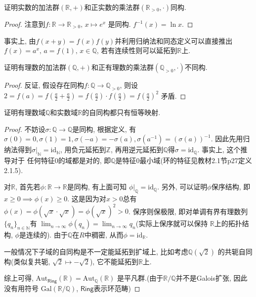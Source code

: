 \begin{problem}
    证明实数的加法群$(\mathbb{R}, +)$和正实数的乘法群$(\mathbb{R}_{>0}, \cdot)$同构.
\end{problem}

\begin{proof}
    注意到$f: \mathbb{R} \to \mathbb{R}_{>0},\, x \mapsto e^x$
是同构. $f^{-1}(x) = \ln x$.
\end{proof}

\begin{remark}
    事实上, 由$f(x + y) = f(x)f(y)$并利用归纳法和同态定义可以直接推出
$f(x) = a^x,\, a = f(1),\, x \in \mathbb{Q}$, 若有连续性则可以延拓到$\mathbb{R}$上.
\end{remark}

\begin{problem}
    证明有理数的加法群$(\mathbb{Q}, +)$和正有理数的乘法群$(\mathbb{Q}_{>0}, \cdot)$不同构.
\end{problem}

\begin{proof}
    反证, 假设存在同构$f: \mathbb{Q} \to \mathbb{Q}_{>0}$,
则设$2 = f(a) = f(\frac{a}{2} + \frac{a}{2}) = f(\frac{a}{2}) \cdot f(\frac{a}{2}) = f(\frac{a}{2})^2$
矛盾.
\end{proof}

\begin{problem}\label{ex:1.4.7}
    证明有理数域$\mathbb{Q}$和实数域$\mathbb{R}$的自同构都只有恒等映射.
\end{problem}

\begin{proof}
    不妨设$\sigma: \mathbb{Q} \to \mathbb{Q}$是同构, 根据定义,
有$\sigma(0) = 0, \sigma(1) = 1, \sigma(-a) = -\sigma(a), \sigma(a^{-1}) = (\sigma(a))^{-1}$.
因此先用归纳法得到$\sigma|_{\mathbb{N}} = \mathrm{id}_{\mathbb{N}}$, 用负元延拓到$\mathbb{Z}$,
再用逆元延拓到$\mathbb{Q}$得$\sigma = \mathrm{id}_{\mathbb{Q}}$. 事实上, 这个推导对于
任何特征$0$的域都是对的, 即$\mathbb{Q}$是特征$0$最小域(环的特征见教材2.1节p27定义2.1.5).

    对$\mathbb{R}$, 首先若$\phi: \mathbb{R} \to \mathbb{R}$是同构, 有上面可知
$\phi|_{\mathbb{Q}} = \mathrm{id}_{\mathbb{Q}}$. 另外, 可以证明$\phi$保序结构,
即$x \geqslant 0 \implies \phi(x) \geqslant 0$. 这是因为对$x > 0$总有
$\phi(x) = \phi(\sqrt{x} \cdot \sqrt{x}) = \phi(\sqrt{x})^2 > 0$. 保序则保极限,
即对单调有界有理数列$\{q_n\}_{n \in \mathbb{N}}$有
$\lim_{n \to \infty} \phi(q_n) = \lim_{n \to \infty} q_n$(实际上保序就可以保持
$\mathbb{R}$上的拓扑结构, $\phi$是连续的). 由于$\mathbb{Q}$在$R$中稠密,
从而$\phi = \mathrm{id}_{\mathbb{R}}$.

    一般情况下子域的自同构是不一定能延拓到扩域上, 比如考虑$\mathbb{Q}(\sqrt{2})$
的共轭自同构(类似复共轭, $\sqrt{2} \mapsto -\sqrt{2}$), 它不能延拓到$\mathbb{R}$上.

    综上可得,
$\mathrm{Aut}_{\mathsf{Ring}}(\mathbb{R}) = \mathrm{Aut}_{\mathbb{Q}}(\mathbb{R})$
是平凡群.(由于$\mathbb{R}/\mathbb{Q}$并不是Galois扩张, 因此没有用符号
$\mathrm{Gal}(\mathbb{R}/\mathbb{Q})$, $\mathsf{Ring}$表示环范畴)
\end{proof}

